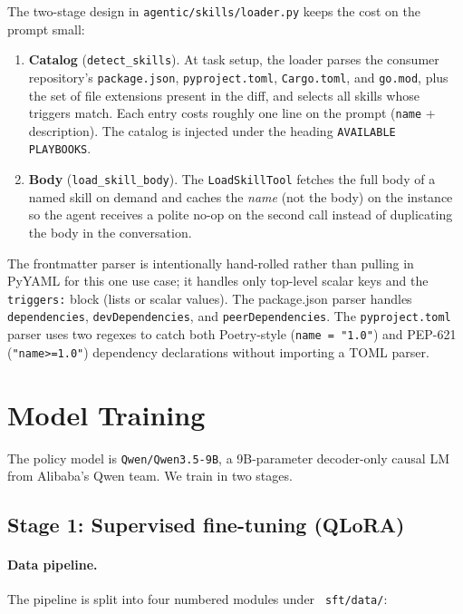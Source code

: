 \documentclass[11pt,a4paper]{article}
\newcommand{\code}[1]{\texttt{\small #1}}
\renewcommand{\path}[1]{\texttt{\small\color{mute} #1}}
\begin{document}
The two-stage design in \code{agentic/skills/loader.py} keeps the cost on
the prompt small:

\begin{enumerate}[leftmargin=*]
  \item \textbf{Catalog} (\code{detect\_skills}). At task setup, the loader
        parses the consumer repository's \code{package.json},
        \code{pyproject.toml}, \code{Cargo.toml}, and \code{go.mod}, plus
        the set of file extensions present in the diff, and selects all
        skills whose triggers match. Each entry costs roughly one line on
        the prompt (\code{name} + description). The catalog is injected
        under the heading \code{AVAILABLE PLAYBOOKS}.
  \item \textbf{Body} (\code{load\_skill\_body}). The
        \code{LoadSkillTool} fetches the full body of a named skill on
        demand and caches the \emph{name} (not the body) on the instance
        so the agent receives a polite no-op on the second call instead
        of duplicating the body in the conversation.
\end{enumerate}

The frontmatter parser is intentionally hand-rolled rather than pulling in
PyYAML for this one use case; it handles only top-level scalar keys and
the \code{triggers:} block (lists or scalar values). The package.json
parser handles \code{dependencies}, \code{devDependencies}, and
\code{peerDependencies}. The \code{pyproject.toml} parser uses two regexes
to catch both Poetry-style (\code{name = "1.0"}) and PEP-621
(\code{"name>=1.0"}) dependency declarations without importing a TOML
parser.

\section{Model Training}

The policy model is \code{Qwen/Qwen3.5-9B}, a 9B-parameter decoder-only
causal LM from Alibaba's Qwen team. We train in two stages.

\subsection{Stage 1: Supervised fine-tuning (QLoRA)}

\paragraph{Data pipeline.} The pipeline is split into four numbered
modules under \path{sft/data/}:
\end{document}
